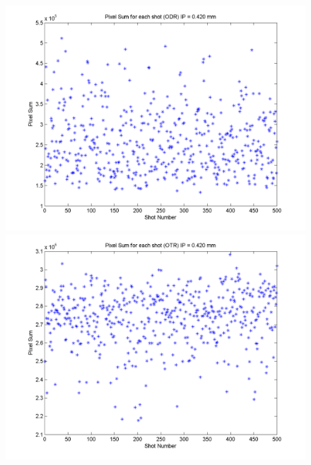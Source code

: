 \documentclass[12pt]{article}
\begin{document}
\begin{figure}
\begin{center}
\includegraphics[scale=0.5]{Figures/PixelSum_ODR_420.PNG}
\includegraphics[scale=0.5]{Figures/PixelSum_OTR_420.PNG}
\caption{}
\end{center}
\end{figure}
\end{document}
